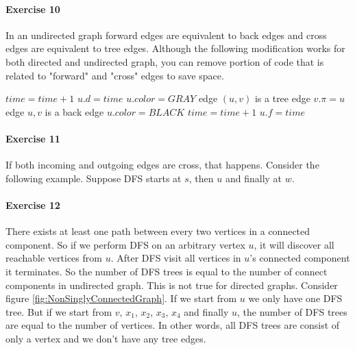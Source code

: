 \documentclass{book}
\begin{document}
	\paragraph{Exercise 10}
	In an undirected graph forward edges are equivalent to back edges and cross edges are equivalent to tree edges. Although the following modification works for both directed and undirected graph, you can remove portion of code that is related to "forward" and "cross" edges to save space.
	\begin{algorithm*}
		\begin{algorithmic}[1]
				\State $time = time + 1$
				\State $u.d = time$
				\State $u.color = GRAY$
					 \Comment edge $(u, v)$ is a tree edge
						\State {}
						\State $v.\pi = u$
						\State {}
					 \Comment edge $u, v$ is a back edge
						\State {}
						\State {}
					\Else
						\State {}
					\EndIf
				\EndFor
				\State $u.color = BLACK$
				\State $time = time + 1$
				\State $u.f = time$
			\EndFunction
		\end{algorithmic}
	\end{algorithm*}
	\paragraph{Exercise 11}
	If both incoming and outgoing edges are cross, that happens. Consider the following example. Suppose DFS starts at $s$, then $u$ and finally at $w$.
	\begin{figure}[h!]
	\end{figure}
	\FloatBarrier
	\paragraph{Exercise 12}
	There exists at least one path between every two vertices in a connected component. So if we perform DFS on an arbitrary vertex $u$, it will discover all reachable vertices from $u$. After DFS visit all vertices in $u$'s connected component it terminates. So the number of DFS trees is equal to the number of connect components in undirected graph. This is not true for directed graphs. Consider figure \ref{fig:NonSinglyConnectedGraph}. If we start from $u$ we only have one DFS tree. But if we start from $v$, $x_1$, $x_2$, $x_3$, $x_4$ and finally $u$, the number of DFS trees are equal to the number of vertices. In other words, all DFS trees are consist of only a vertex and we don't have any tree edges.
	
\end{document}

